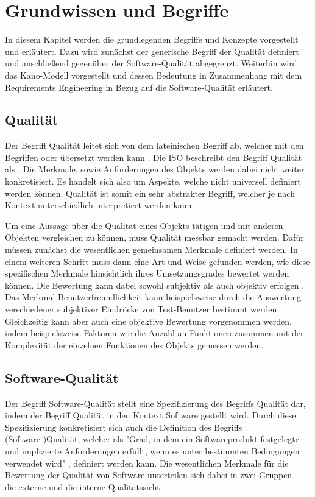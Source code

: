 \section{Grundwissen und Begriffe}
In diesem Kapitel werden die grundlegenden Begriffe und Konzepte vorgestellt und erläutert.
Dazu wird zunächst der generische Begriff der Qualität definiert und anschließend gegenüber der Software-Qualität abgegrenzt.
Weiterhin wird das Kano-Modell vorgestellt und dessen Bedeutung in Zusammenhang mit dem Requirements Engineering in Bezug auf die Software-Qualität erläutert.
\subsection{Qualität}
Der Begriff Qualität leitet sich von dem lateinischen Begriff  ab, welcher mit den Begriffen  oder  übersetzt werden kann \autocite[vgl.][]{noauthor_was_nodate}.
Die \ac{ISO} beschreibt den Begriff Qualität als  \autocite[S. 17]{iso_iso_2015}.
Die Merkmale, sowie Anforderungen des Objekts werden dabei nicht weiter konkretisiert.
Es handelt sich also um Aspekte, welche nicht universell definiert werden können.
Qualität ist somit ein sehr abstrakter Begriff, welcher je nach Kontext unterschiedlich interpretiert werden kann.

Um eine Aussage über die Qualität eines Objekts tätigen und mit anderen Objekten vergleichen zu können, muss Qualität messbar gemacht werden.
Dafür müssen zunächst die wesentlichen gemeinsamen Merkmale definiert werden.
In einem weiteren Schritt muss dann eine Art und Weise gefunden werden, wie diese spezifischen Merkmale hinsichtlich ihres Umsetzungsgrades bewertet werden können.
Die Bewertung kann dabei sowohl subjektiv als auch objektiv erfolgen \autocite[vgl.][S. 53]{shewhart_economic_1931}.
Das Merkmal Benutzerfreundlichkeit kann beispielsweise durch die Auswertung verschiedener subjektiver Eindrücke von Test-Benutzer bestimmt werden.
Gleichzeitig kann aber auch eine objektive Bewertung vorgenommen werden, indem beispielsweise Faktoren wie die Anzahl an Funktionen zusammen mit der Komplexität der einzelnen Funktionen des Objekts gemessen werden.

\subsection{Software-Qualität}
Der Begriff Software-Qualität stellt eine Spezifizierung des Begriffs Qualität dar, indem der Begriff Qualität in den Kontext Software gestellt wird.
Durch diese Spezifizierung konkretisiert sich auch die Definition des Begriffs (Software-)Qualität, welcher als "Grad, in dem ein Softwareprodukt festgelegte und implizierte Anforderungen erfüllt, wenn es unter bestimmten Bedingungen verwendet wird" \autocite[S. 17]{iso_iso_2011}, definiert werden kann.
Die wesentlichen Merkmale für die Bewertung der Qualität von Software unterteilen sich dabei in zwei Gruppen -- die externe und die interne Qualitätssicht.

